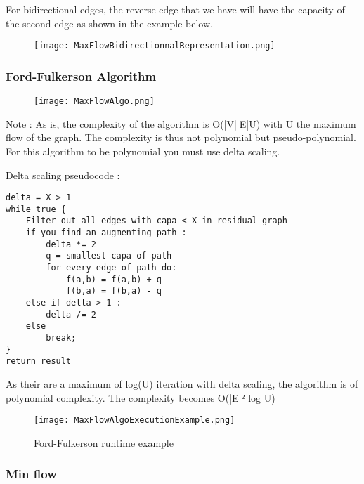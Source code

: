 For bidirectional edges, the reverse edge that we have will have the capacity of the second edge as shown in the example below.

\begin{figure}[!ht]
    \centering
    \texttt{[image: MaxFlowBidirectionnalRepresentation.png]}
\end{figure}
\FloatBarrier

\subsubsection{Ford-Fulkerson Algorithm}

\begin{figure}[!ht]
    \centering
    \texttt{[image: MaxFlowAlgo.png]}
\end{figure}
\FloatBarrier

Note : As is, the complexity of the algorithm is O(|V||E|U) with U the maximum flow of the graph. The complexity is thus not polynomial but pseudo-polynomial. For this algorithm to be polynomial you must use delta scaling. \newline

Delta scaling pseudocode :

\begin{lstlisting}
delta = X > 1
while true {
	Filter out all edges with capa < X in residual graph
	if you find an augmenting path :
		delta *= 2
		q = smallest capa of path
		for every edge of path do:
			f(a,b) = f(a,b) + q
			f(b,a) = f(b,a) - q
	else if delta > 1 :
		delta /= 2
	else
		break;
}
return result
\end{lstlisting}

As their are a maximum of log(U) iteration with delta scaling, the algorithm is of polynomial complexity. The complexity becomes O(|E|² log U)

\begin{figure}[!ht]
    \centering
    \texttt{[image: MaxFlowAlgoExecutionExample.png]}
    \caption{Ford-Fulkerson runtime example}
    \label{fig:Ford-Fulkerson_example}
\end{figure}

\subsubsection{Min flow}

\begin{figure}[!ht]
    \centering
\end{figure}

